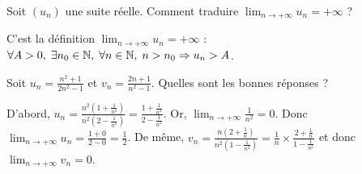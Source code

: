 \begin{question}

Soit $(u_n)$ une suite réelle. Comment traduire $\displaystyle \lim _{n\to +\infty}u_n=+\infty$ ?
\begin{answers}  
\end{answers}
\begin{explanations}
C'est la définition $\displaystyle \lim _{n\to +\infty}u_n=+\infty$ : $\forall A>0,\; \exists n_0\in \mathbb{N},\; \forall n\in \mathbb{N},\; n>n_0\Rightarrow u_n>A$.
\end{explanations}
\end{question}



\begin{question}

Soit $\displaystyle u_n=\frac{n^2+1}{2n^2-1}$ et $\displaystyle v_n=\frac{2n+1}{n^2-1}$. Quelles sont les bonnes réponses ?
\begin{answers}  
\end{answers}
\begin{explanations}
D'abord, $\displaystyle u_n=\frac{n^2\left(1+\frac{1}{n^2}\right)}{n^2\left(2-\frac{1}{n^2}\right)}=\frac{1+\frac{1}{n^2}}{2-\frac{1}{n^2}}$. Or, $\displaystyle \lim _{n\to +\infty}\frac{1}{n^2}=0$. Donc $\displaystyle \lim _{n\to +\infty}u_n=\frac{1+0}{2-0}=\frac{1}{2}$. De même, $\displaystyle v_n=\frac{n\left(2+\frac{1}{n}\right)}{n^2\left(1-\frac{1}{n^2}\right)}=\frac{1}{n}\times\frac{2+\frac{1}{n}}{1-\frac{1}{n^2}}$ et donc $\displaystyle \lim _{n\to +\infty}v_n=0$.
\end{explanations}
\end{question}




